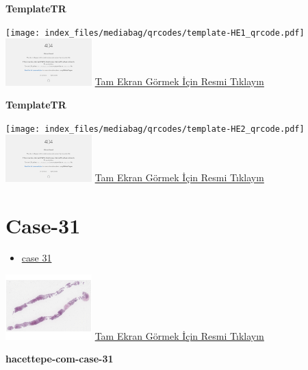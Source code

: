 \documentclass[
  letterpaper,
  DIV=11,
  numbers=noendperiod]{scrreprt}
\providecommand{\tightlist}{%
  \setlength{\itemsep}{0pt}\setlength{\parskip}{0pt}}\usepackage{longtable,booktabs,array}
\begin{document}
\textbf{TemplateTR}

\texttt{[image: index\_files/mediabag/qrcodes/template-HE1\_qrcode.pdf]}
\href{https://images.patolojiatlasi.com/template/HE1.html}{\includegraphics[width=0.25\textwidth,height=\textheight]{./screenshots/thumbnail_template-HE1.png}}
\href{https://images.patolojiatlasi.com/template/HE1.html}{Tam Ekran
Görmek İçin Resmi Tıklayın}

\textbf{TemplateTR}

\texttt{[image: index\_files/mediabag/qrcodes/template-HE2\_qrcode.pdf]}
\href{https://images.patolojiatlasi.com/template/HE2.html}{\includegraphics[width=0.25\textwidth,height=\textheight]{./screenshots/thumbnail_template-HE2.png}}
\href{https://images.patolojiatlasi.com/template/HE2.html}{Tam Ekran
Görmek İçin Resmi Tıklayın}

\hypertarget{sec-hacettepe-case-of-the-month-case-31}{%
\section{Case-31}\label{sec-hacettepe-case-of-the-month-case-31}}

\begin{itemize}
\tightlist
\item
  \href{https://www.youtube.com/watch?v=KHM2yQkRIV8&ab_channel=KemalKosemehmetoglu}{case
  31}
\end{itemize}

\href{https://images.patolojiatlasi.com/hacettepe-com-case-31/HE.html}{\includegraphics[width=0.25\textwidth,height=\textheight]{./screenshots/thumbnail_hacettepe-com-case-31.png}}
\href{https://images.patolojiatlasi.com/hacettepe-com-case-31/HE.html}{Tam
Ekran Görmek İçin Resmi Tıklayın}

\textbf{hacettepe-com-case-31}
\end{document}
